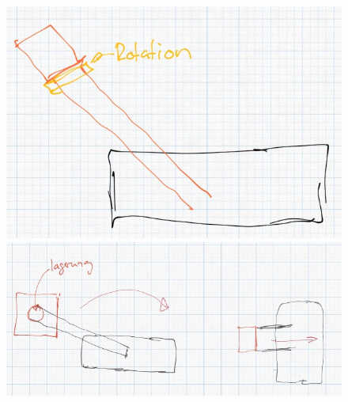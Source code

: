 \begin{figure}[h!]
    \centering
    \begin{minipage}{0.45\textwidth}
        \centering
        \includegraphics[width=\textwidth]{img/technologierecherche/Rotation/ueberkopf_griff_gelagert.jpg}
        \caption{}
        \label{img:tech_ueberkopf_griff_gelagert}
    \end{minipage}
    \hfill
    \begin{minipage}{0.45\textwidth}
        \centering
        \includegraphics[width=\textwidth]{img/technologierecherche/Rotation/ueberkopf_objekt_gelagert.jpg}
        \caption{} 
        \label{img:tech_ueberkopf_objekt_gelagert}
    \end{minipage}
\end{figure}

